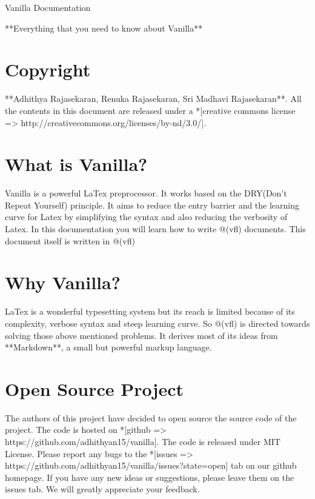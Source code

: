 \documentclass{article}
\begin{document}
\begin{center}

\huge{Vanilla Documentation}\vspace{5pt}

\large{**Everything that you need to know about Vanilla**}

\end{center}

\vspace{30pt}

\section*{Copyright}

**\textcopyright Adhithya Rajasekaran, Renuka Rajasekaran, Sri Madhavi Rajasekaran**. All the contents in this document are released under a *[creative commons license =>  http://creativecommons.org/licenses/by-nd/3.0/]. 

\section*{What is Vanilla?}

Vanilla is a powerful LaTex preprocessor. It works based on the DRY(Don't Repeat Yourself) principle. It aims to reduce the entry barrier and the learning curve for Latex by simplifying the syntax and also reducing the verbosity of Latex. In this documentation you will learn how to write @(vfl) documents. This document itself is written in @(vfl) \vspace{5pt}

\section*{Why Vanilla?}

LaTex is a wonderful typesetting system but its reach is limited because of its complexity, verbose syntax and steep learning curve. So @(vfl) is directed towards solving those above mentioned problems. It derives most of its ideas from 
**Markdown**, a small but powerful markup language. 

\section*{Open Source Project}

The authors of this project have decided to open source the source code of the project. The code is hosted on *[github => https://github.com/adhithyan15/vanilla]. The code is released under MIT License. Please report any bugs to the *[issues => https://github.com/adhithyan15/vanilla/issues?state=open] tab on our github homepage. If you have any new ideas or suggestions, please leave them on the issues tab. We will greatly appreciate your feedback.   
\end{document}
